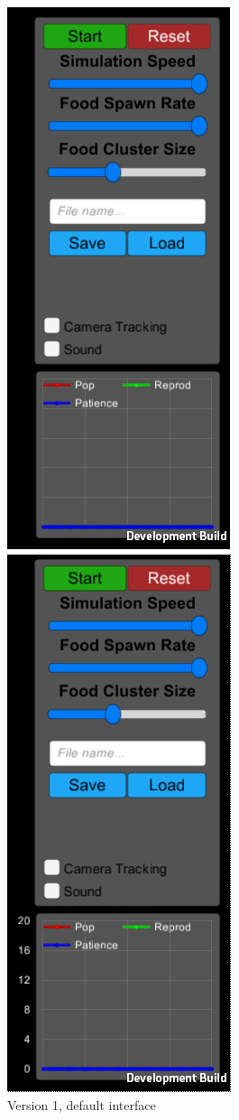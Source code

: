 \begin{figure}[!th]
\begin{minipage}[b]{0.32\textwidth}
		\centering
		\includegraphics[scale=0.65]{images/uiv1}
		\caption{\label{fig:uiv1}Version 1, default interface}
	\end{minipage}
	\hfill
	\begin{minipage}[b]{0.23\textwidth}
		\centering
		\includegraphics[scale=0.65]{images/uiv2}

\end{minipage}
\end{figure}
